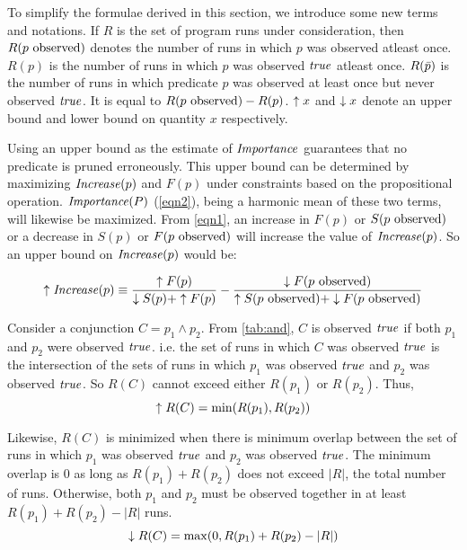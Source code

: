 To simplify the formulae derived in this section, we introduce some new terms and
notations.  If $R$ is the set of program runs under consideration, then 
$R(\text{$p$ observed})$ denotes the number of runs in which $p$ was observed atleast
once.  $R(p)$ is the number of runs in which $p$ was observed $\mathit{true}$ atleast once.
$R(\text{$\bar{p}$})$ is the number of runs in which predicate $p$ was observed
at least once but never observed $\mathit{true}$.  It is equal to $R(\text{$p$ observed}) - R(p)$.
$\uparrow x$ and $\downarrow x$ denote an upper bound and lower bound on quantity $x$
respectively.  

Using an upper bound as the estimate of $\mathit{Importance}$ guarantees that no 
predicate is pruned erroneously.  This upper bound can be determined by maximizing
$\mathit{Increase}(p)$ and $F(p)$ under constraints based on the propositional operation.
$\mathit{Importance}(P)$ (\autoref{eqn2}), being a harmonic mean of these two terms, will
likewise be maximized.  From \autoref{eqn1}, an increase in $F(p)$ or $S(\text{$p$ observed})$
or a decrease in $S(p)$ or $F(\text{$p$ observed})$ will increase the value of $\mathit{Increase}(p)$.
So an upper bound on $\mathit{Increase}(p)$ would be:

\begin{equation}
\label{eqn3}
\uparrow\mathit{Increase}(p) \equiv
\frac{\uparrow F(p)}{\downarrow S(p) + \uparrow F(p)}
-
\frac{\downarrow F(\text{$p$ observed})}{\uparrow S(\text{$p$ observed}) + \downarrow F(\text{$p$ observed})}
\end{equation}

Consider a conjunction $C = p_1 \wedge p_2$.  From \autoref{tab:and}, $C$ is
observed $\mathit{true}$ if both $p_1$ and $p_2$ were observed $\mathit{true}$.  i.e. the set
of runs in which $C$ was observed $\mathit{true}$ is the intersection of the sets of
runs in which $p_1$ was observed $\mathit{true}$ and $p_2$ was observed $\mathit{true}$.  So
$R(C)$ cannot exceed either $R(p_1)$ or $R(p_2)$.  Thus,
\begin{equation}
  \uparrow R(C) = \min(R(p_1), R(p_2))
\end{equation}

Likewise, $R(C)$ is minimized when there is minimum overlap between the set
of runs in which $p_1$ was observed $\mathit{true}$ and $p_2$ was observed $\mathit{true}$.
The minimum overlap is $0$ as long as $R(p_1) + R(p_2)$ does not exceed $|R|$,
the total number of runs.  Otherwise, both $p_1$ and $p_2$ must be observed
together in at least $R(p_1) + R(p_2) - |R|$ runs.
\begin{equation}
  \downarrow R(C) = \max(0, R(p_1) + R(p_2) - |R|)
\end{equation}

